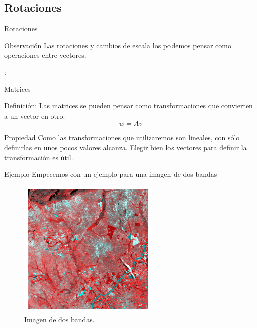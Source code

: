 \documentclass[handout]{beamer}
\begin{document}
\subsection{Rotaciones}
\begin{frame}{Rotaciones}
  \begin{block}{Observación}
    Las rotaciones y cambios de escala los podemos pensar como operaciones entre vectores.
  \end{block}:
\end{frame}

\begin{frame}{Matrices}
  \begin{block}{Definición:}
    Las matrices se pueden pensar como transformaciones que convierten a un vector en otro. \pause
    \begin{equation}
      w = Av
    \end{equation}
  \end{block}\pause
  \begin{alertblock}{Propiedad}
    Como las transformaciones que utilizaremos son lineales, con sólo definirlas en unos pocos valores alcanza. \pause Elegir bien los vectores para definir la transformación es útil.
  \end{alertblock}
\end{frame}

\begin{frame}{Ejemplo}
  Empecemos con un ejemplo para una imagen de dos bandas
  \begin{figure}
  \centering
  \includegraphics[width=0.6\textwidth]{imagenes/nir-red.png}
  \caption{Imagen de dos bandas.}
  \end{figure}
\end{frame}
\end{document}
